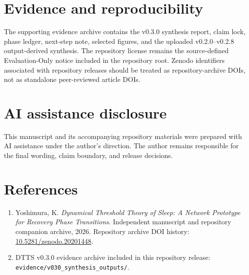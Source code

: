 \documentclass[11pt,a4paper]{article}
\begin{document}
\section{Evidence and reproducibility}
The supporting evidence archive contains the v0.3.0 synthesis report, claim lock, phase ledger, next-step note, selected figures, and the uploaded v0.2.0--v0.2.8 output-derived synthesis. The repository license remains the source-defined Evaluation-Only notice included in the repository root. Zenodo identifiers associated with repository releases should be treated as repository-archive DOIs, not as standalone peer-reviewed article DOIs.

\section*{AI assistance disclosure}
This manuscript and its accompanying repository materials were prepared with AI assistance under the author's direction. The author remains responsible for the final wording, claim boundary, and release decisions.

\section*{References}
\begin{enumerate}
\item Yoshimura, K. \textit{Dynamical Threshold Theory of Sleep: A Network Prototype for Recovery Phase Transitions}. Independent manuscript and repository companion archive, 2026. Repository archive DOI history: \href{https://doi.org/10.5281/zenodo.20201448}{10.5281/zenodo.20201448}.
\item DTTS v0.3.0 evidence archive included in this repository release: \texttt{evidence/v030\_synthesis\_outputs/}.
\end{enumerate}
\end{document}
